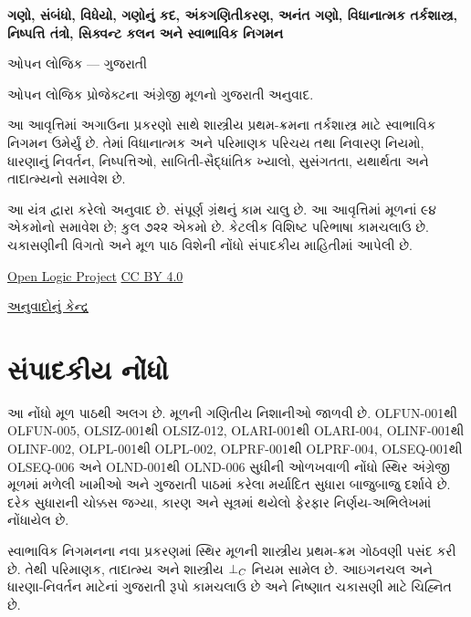 \renewcommand{\ref}[1]{%
  \ifcsname guexternalref@#1\endcsname
    \csname guexternalref@#1\endcsname
  \else
    \guoriginalref{#1}%
  \fi}
\begin{titlepage}
{\LARGE\bfseries ગણો, સંબંધો, વિધેયો, ગણોનું કદ, અંકગણિતીકરણ,
અનંત ગણો, વિધાનાત્મક તર્કશાસ્ત્ર, નિષ્પત્તિ તંત્રો, સિક્વન્ટ કલન
અને સ્વાભાવિક નિગમન\par}
\vspace{1em}
{\Large ઓપન લોજિક — ગુજરાતી\par}
\vspace{2em}
ઓપન લોજિક પ્રોજેક્ટના અંગ્રેજી મૂળનો ગુજરાતી અનુવાદ.\par
\vspace{1em}
આ આવૃત્તિમાં અગાઉના પ્રકરણો સાથે શાસ્ત્રીય પ્રથમ-ક્રમના તર્કશાસ્ત્ર
માટે સ્વાભાવિક નિગમન ઉમેર્યું છે. તેમાં વિધાનાત્મક અને પરિમાણક
પરિચય તથા નિવારણ નિયમો, ધારણાનું નિવર્તન, નિષ્પત્તિઓ,
સાબિતી-સૈદ્ધાંતિક ખ્યાલો, સુસંગતતા, યથાર્થતા અને તાદાત્મ્યનો સમાવેશ છે.\par
\vfill
આ યંત્ર દ્વારા કરેલો અનુવાદ છે. સંપૂર્ણ ગ્રંથનું કામ ચાલુ છે.
આ આવૃત્તિમાં મૂળનાં ૯૪ એકમોનો સમાવેશ છે; કુલ ૭૨૨ એકમો છે.
કેટલીક વિશિષ્ટ પરિભાષા કામચલાઉ છે. ચકાસણીની વિગતો અને
મૂળ પાઠ વિશેની નોંધો સંપાદકીય માહિતીમાં આપેલી છે.\par
\vspace{1em}
\href{https://github.com/OpenLogicProject/OpenLogic}{Open Logic Project}
\quad \href{https://creativecommons.org/licenses/by/4.0/}{CC BY 4.0}\par
\href{https://github.com/KokunoYumeto/OpenLogic-translations}{અનુવાદોનું કેન્દ્ર}\par
\end{titlepage}
\tableofcontents
\clearpage

\clearpage
\section*{સંપાદકીય નોંધો}
આ નોંધો મૂળ પાઠથી અલગ છે. મૂળની ગણિતીય નિશાનીઓ જાળવી છે.
OLFUN-001થી OLFUN-005, OLSIZ-001થી OLSIZ-012, OLARI-001થી
OLARI-004, OLINF-001થી OLINF-002, OLPL-001થી OLPL-002,
OLPRF-001થી OLPRF-004, OLSEQ-001થી OLSEQ-006 અને
OLND-001થી OLND-006 સુધીની ઓળખવાળી
નોંધો સ્થિર અંગ્રેજી મૂળમાં મળેલી ખામીઓ અને ગુજરાતી પાઠમાં કરેલા
મર્યાદિત સુધારા બાજુબાજુ દર્શાવે છે. દરેક સુધારાની ચોક્કસ જગ્યા,
કારણ અને સૂત્રમાં થયેલો ફેરફાર નિર્ણય-અભિલેખમાં નોંધાયેલ છે.

સ્વાભાવિક નિગમનના નવા પ્રકરણમાં સ્થિર મૂળની શાસ્ત્રીય પ્રથમ-ક્રમ
ગોઠવણી પસંદ કરી છે. તેથી પરિમાણક, તાદાત્મ્ય અને શાસ્ત્રીય
$\bot_C$ નિયમ સામેલ છે. આઇગનચલ અને ધારણા-નિવર્તન માટેનાં ગુજરાતી
રૂપો કામચલાઉ છે અને નિષ્ણાત ચકાસણી માટે ચિહ્નિત છે.

